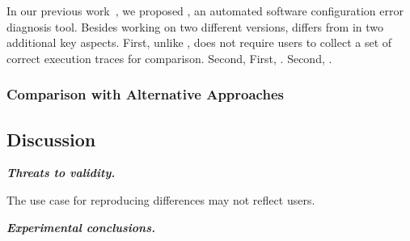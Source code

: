 
In our previous work~\cite{}, we proposed \prevtool, an automated
software configuration error diagnosis tool. Besides working
on two different versions, \ourtool differs from \prevtool in
two additional key aspects. First, unlike \prevtool, \ourtool
does not require users to collect a set of correct execution traces
for comparison. Second, 
First, . Second, .


\subsubsection{Comparison with Alternative Approaches}
\label{sec:alternative}



\subsection{Discussion}

\noindent \textbf{\textit{Threats to validity.}}

\vspace{1mm}
The use case for reproducing differences may not reflect
users.

\noindent \textbf{\textit{Experimental conclusions.}}
